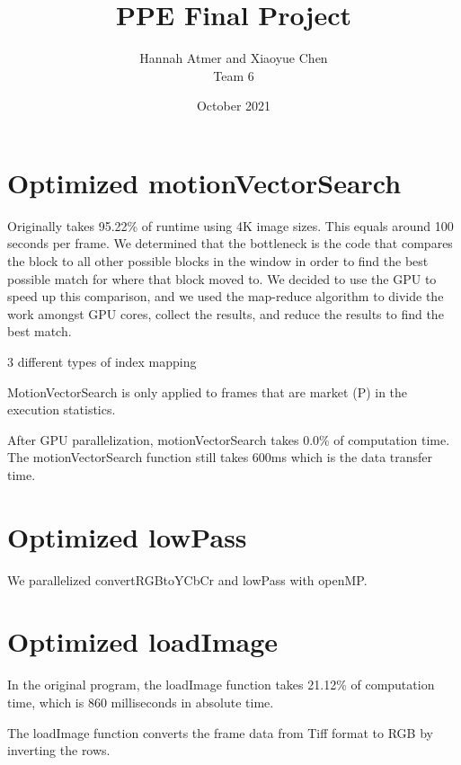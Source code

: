 \documentclass{article}
\title{PPE Final Project}
\author{Hannah Atmer and Xiaoyue Chen \\ Team 6}
\date{October 2021}
\begin{document}
\maketitle


\section{Optimized motionVectorSearch}

Originally takes 95.22\% of runtime using 4K image sizes. This equals around 100 seconds per frame.
We determined that the bottleneck is the code that compares the block to all other possible blocks in the window in order to find the best possible match for where that block moved to.
We decided to use the GPU to speed up this comparison, and we used the map-reduce algorithm to divide the work amongst GPU cores, collect the results, and reduce the results to find the best match.

3 different types of index mapping


MotionVectorSearch is only applied to frames that are market (P) in the execution statistics.

After GPU parallelization, motionVectorSearch takes 0.0\% of computation time. The motionVectorSearch function still takes 600ms which is the data transfer time.


\section{Optimized lowPass}

We parallelized convertRGBtoYCbCr and lowPass with openMP.


\section{Optimized loadImage}

In the original program, the loadImage function takes 21.12\% of computation time, which is 860 milliseconds in absolute time.


The loadImage function converts the frame data from Tiff format to RGB by inverting the rows.
\end{document}
